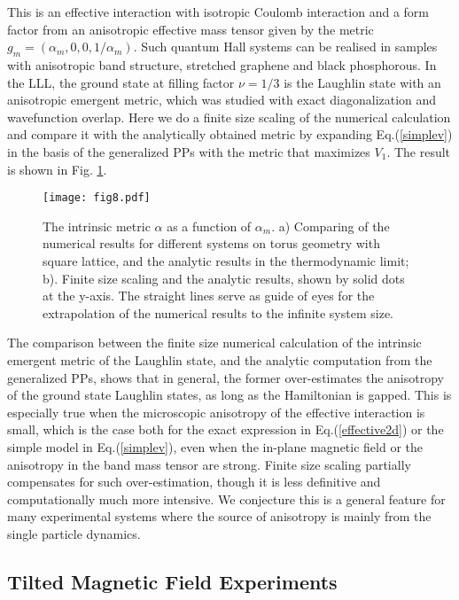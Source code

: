 \documentclass[twocolumn,showpacs,amsmath,amstex,amssymb,mathfonts,prb]{revtex4-1}
\begin{document}
This is an effective interaction with isotropic Coulomb interaction and a form factor from an anisotropic effective mass tensor given by the metric $g_m=\left(\alpha_m,0,0,1/\alpha_m\right)$. Such quantum Hall systems can be realised in samples with anisotropic band structure, stretched graphene and black phosphorous. In the LLL, the ground state at filling factor $\nu=1/3$ is the Laughlin state with an anisotropic emergent metric, which was studied with exact diagonalization and wavefunction overlap\cite{yang1}. Here we do a finite size scaling of the numerical calculation and compare it with the analytically obtained metric by expanding Eq.(\ref{simplev}) in the basis of the generalized PPs with the metric that maximizes $V_1$. The result is shown in Fig. \ref{numericanalytic}.
\begin{figure}[htb]
\texttt{[image: fig8.pdf]}
\caption{The intrinsic metric $\alpha$ as a function of $\alpha_m$. a) Comparing of the numerical results for different systems on torus geometry with square lattice, and the analytic results in the thermodynamic limit; b). Finite size scaling and the analytic results, shown by solid dots at the y-axis. The straight lines serve as guide of eyes for the extrapolation of the numerical results to the infinite system size.}
\label{numericanalytic}
\end{figure} 

The comparison between the finite size numerical calculation of the intrinsic emergent metric of the Laughlin state, and the analytic computation from the generalized PPs, shows that in general, the former over-estimates the anisotropy of the ground state Laughlin states, as long as the Hamiltonian is gapped. This is especially true when the microscopic anisotropy of the effective interaction is small, which is the case both for the exact expression in Eq.(\ref{effective2d}) or the simple model in Eq.(\ref{simplev}), even when the in-plane magnetic field or the anisotropy in the band mass tensor are strong. Finite size scaling partially compensates for such over-estimation, though it is less definitive and computationally much more intensive. We conjecture this is a general feature for many experimental systems where the source of anisotropy is mainly from the single particle dynamics.

\subsection{Tilted Magnetic Field Experiments}
\end{document}
